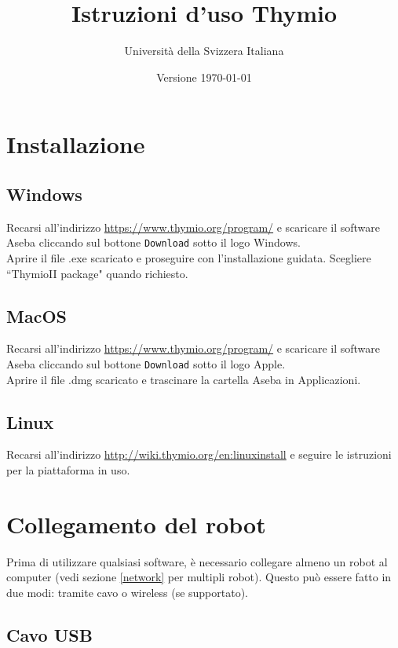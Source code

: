\documentclass[12pt]{article}
\title{Istruzioni d'uso Thymio}
\author{Università della Svizzera Italiana}
\date{Versione \today}
\begin{document}
\maketitle
\tableofcontents
\newpage


\section{Installazione}

	\subsection{Windows}
	
		Recarsi all'indirizzo \url{https://www.thymio.org/program/} e scaricare il software Aseba cliccando sul bottone \texttt{Download} sotto il logo Windows.\\
		Aprire il file .exe scaricato e proseguire con l'installazione guidata. Scegliere ``ThymioII package" quando richiesto.
		
	\subsection{MacOS}
	
		Recarsi all'indirizzo \url{https://www.thymio.org/program/} e scaricare il software Aseba cliccando sul bottone \texttt{Download} sotto il logo Apple.\\	
		Aprire il file .dmg scaricato e trascinare la cartella Aseba in Applicazioni.
		
	\subsection{Linux}
	
		Recarsi all'indirizzo \url{http://wiki.thymio.org/en:linuxinstall} e seguire le istruzioni per la piattaforma in uso.
			

\section{Collegamento del robot}

	Prima di utilizzare qualsiasi software, è necessario collegare almeno un robot al computer (vedi sezione \ref{network} per multipli robot). Questo può essere fatto in due modi: tramite cavo o wireless (se supportato).
	
	\subsection{Cavo USB}
	
\end{document}
